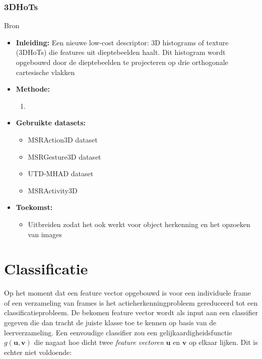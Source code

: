 \subsection{3DHoTs}
 Bron \cite{Chen2017}
\begin{itemize}
	\item \textbf{Inleiding:} Een nieuwe low-cost descriptor: 3D histograms of texture (3DHoTs) die features uit dieptebeelden haalt. Dit histogram wordt opgebouwd door de dieptebeelden te projecteren op drie orthogonale cartesische vlakken
	\item \textbf{Methode:} 
	\begin{enumerate}
		\item
	\end{enumerate}
	\item \textbf{Gebruikte datasets:}
	\begin{itemize}
		\item MSRAction3D dataset
		\item MSRGesture3D dataset
		\item UTD-MHAD dataset
		\item MSRActivity3D
	\end{itemize}
	\item \textbf{Toekomst:}
	\begin{itemize}
		\item Uitbreiden zodat het ook werkt voor object herkenning en het opzoeken van images
	\end{itemize}
\end{itemize}



\chapter{Classificatie}
\label{ch:classificatie}
Op het moment dat een feature vector opgebouwd is voor een individuele frame of een verzameling van frames is het actieherkenningprobleem gereduceerd tot een classificatieprobleem. De bekomen feature vector wordt als input aan een classifier gegeven die dan tracht de juiste klasse toe te kennen op basis van de leerverzameling. Een eenvoudige classifier zou een gelijkaardigheidsfunctie $g(\textbf{u}, \textbf{v})$ die nagaat hoe dicht twee \textit{feature vectoren} $\textbf{u}$ en $\textbf{v}$ op elkaar lijken. Dit is echter niet voldoende: 

